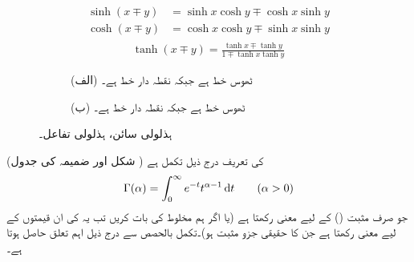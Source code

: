 \begin{gather}
\begin{aligned}
\sinh(x\mp y)&=\sinh x\cosh y\mp \cosh x\sinh y\\
\cosh(x\mp y)&=\cosh x\cosh y\mp \sinh x\sinh y
\end{aligned}
\end{gather}
%
\begin{align}
\tanh(x\mp y)=\frac{\tanh x\mp \tanh y}{1\mp \tanh x\tanh y}
\end{align}
%
\begin{figure}
\centering
\begin{subfigure}{0.5\textwidth}
\centering
{}
\caption*{(الف) ٹھوس خط  ہے جبکہ نقطہ دار خط  ہے۔}
\end{subfigure}%
\begin{subfigure}{0.5\textwidth}
\centering
{}
\caption*{(ب) ٹھوس خط  ہے جبکہ نقطہ دار خط  ہے۔}
\end{subfigure}%
\caption{ہذلولی سائن، ہذلولی تفاعل۔}
\label{شکل_ضمیمہ_مفید_ہذلولی_تفاعل}
\end{figure}
 (شکل  اور ضمیمہ  کی جدول )  کی تعریف درج ذیل تکمل ہے
\begin{align}\label{مساوات_ضمیمہ_گیما_تکمل_الف}
\Gamma(\alpha)=\int_{0}^{\infty} e^{-t}t^{\alpha-1}\dif t \quad \quad (\alpha>0)
\end{align}
جو صرف مثبت () کے لیے معنی رکھتا ہے (یا اگر ہم مخلوط  کی بات کریں تب یہ  کی ان قیمتوں کے لیے معنی رکھتا ہے جن  کا حقیقی جزو مثبت ہو)۔تکمل بالحصص سے درج ذیل اہم تعلق حاصل ہوتا ہے۔
